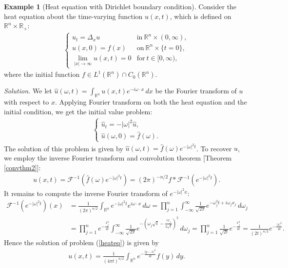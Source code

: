 \documentclass{article}
\numberwithin{equation}{section}
\newcommand{\bbR}{\mathbb{R}}
\renewcommand{\cal}{\mathcal}
\newcommand{\wh}{\widehat}
\theoremstyle{plain}
\theoremstyle{definition}
\newtheorem{example}[theorem]{Example}
\begin{document}
\begin{example}[Heat equation with Dirichlet boundary condition]
Consider the heat equation about the time-varying function $u(x,t)$, which is defined on $\bbR^n\times\bbR_+$:
\begin{align}
\begin{cases}
	u_t=\Delta_x u & \mathrm{in}\ \bbR^n\times(0,\infty),\\
	u(x,0)=f(x)& \mathrm{on}\ \bbR^n\times\{t=0\},\\
	\lim_{\vert x\vert\to\infty}u(x,t)=0 &\mathrm{for}\ t\in[0,\infty),
\end{cases}\label{heateq}
\end{align}
where the initial function $f\in L^1(\bbR^n)\cap C_0(\bbR^n)$.
\end{example}
\textit{\hspace{-1.5em}Solution.}
We let $\wh{u}(\omega,t)=\int_{\bbR^n}u(x,t)e^{-i\omega\cdot x}\,dx$ be the Fourier transform of $u$ with respect to $x$. Applying Fourier transform on both the heat equation and the initial condition, we get the initial value problem:\vspace{-0.1cm}
\begin{align*}
\begin{cases}
\wh{u}_t=-\vert\omega\vert^2\wh{u},\\
\wh{u}(\omega,0)=\wh{f}(\omega).
\end{cases}
\end{align*}
The solution of this problem is given by $\wh{u}(\omega,t)=\wh{f}(\omega)e^{-\vert\omega\vert^2 t}$. To recover $u$, we employ the inverse Fourier transform and convolution theorem [Theorem \ref{convthm2}]:
\begin{align*}
	u(x,t)=\cal{F}^{-1}\left(\wh{f}(\omega)e^{-\vert\omega\vert^2 t}\right)=(2\pi)^{-n/2} f*\cal{F}^{-1}(e^{-\vert\omega\vert^2 t}).
\end{align*}
It remains to compute the inverse Fourier transform of $e^{-\vert\omega\vert^2 x}$:\vspace{-0.1cm}
\begin{align*}
	\cal{F}^{-1}(e^{-\vert\omega\vert^2 t})(x)&=\frac{1}{(2\pi)^{n/2}}\int_{\bbR^n}e^{-\vert\omega\vert^2 t}e^{i\omega\cdot x}\,d\omega=\prod_{j=1}^n\int_{-\infty}^\infty\frac{1}{\sqrt{2\pi}}e^{-\omega_j^2t+i\omega_jx_j}\,d\omega_j\\
	&=\prod_{j=1}^n e^{-\frac{x_j^2}{4t}}\int_{-\infty}^\infty\frac{1}{\sqrt{2\pi}}e^{-\left(\omega_j\sqrt{t}-\frac{ix_j}{2\sqrt{t}}\right)^2}\,d\omega_j=\prod_{j=1}^n \frac{1}{\sqrt{2t}}e^{-\frac{x_j^2}{4t}}=\frac{1}{(2t)^{n/2}}e^{-\frac{\vert x\vert^2}{4t}}.
\end{align*}
Hence the solution of problem (\ref{heateq}) is given by
\begin{align*}
	u(x,t)=\frac{1}{(4\pi t)^{n/2}}\int_{\bbR^n}e^{-\frac{\vert y-x\vert^2}{4t}}f(y)\,dy.\tag*{\qed}
\end{align*}
\end{document}
